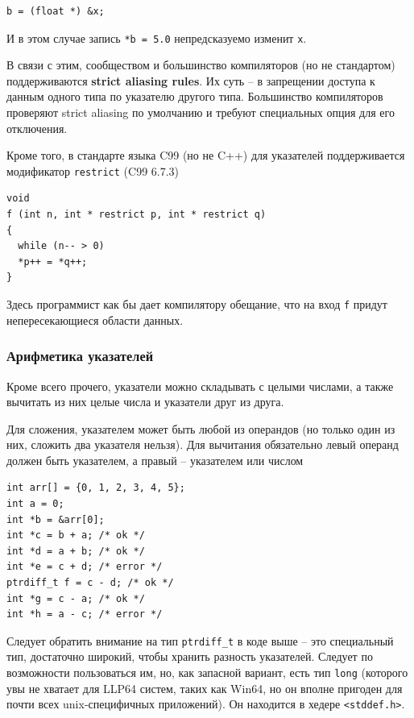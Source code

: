 \documentclass[a4paper,12pt,oneside]{article}
\begin{document}
\begin{lstlisting}
b = (float *) &x;
\end{lstlisting}

И в этом случае запись \lstinline!*b = 5.0! непредсказуемо изменит \lstinline!x!.

В связи с этим, сообществом и большинство компиляторов (но не стандартом) поддерживаются \textbf{strict aliasing rules}\label{StrictAliasing}. Их суть -- в запрещении доступа к данным одного типа по указателю другого типа. Большинство компиляторов проверяют strict aliasing по умолчанию и требуют специальных опция для его отключения.

Кроме того, в стандарте языка C99 (но не C++) для указателей поддерживается модификатор \lstinline!restrict! (C99 6.7.3)

\begin{lstlisting}
void 
f (int n, int * restrict p, int * restrict q)
{
  while (n-- > 0)
  *p++ = *q++;
}
\end{lstlisting}

Здесь программист как бы дает компилятору обещание, что на вход \lstinline!f! придут непересекающиеся области данных.

\subsubsection{Арифметика указателей}

Кроме всего прочего, указатели можно складывать с целыми числами, а также вычитать из них целые числа и указатели друг из друга.

Для сложения, указателем может быть любой из операндов (но только один из них, сложить два указателя нельзя). Для вычитания обязательно левый операнд должен быть указателем, а правый -- указателем или числом

\begin{lstlisting}
int arr[] = {0, 1, 2, 3, 4, 5};
int a = 0; 
int *b = &arr[0];
int *c = b + a; /* ok */
int *d = a + b; /* ok */
int *e = c + d; /* error */
ptrdiff_t f = c - d; /* ok */
int *g = c - a; /* ok */
int *h = a - c; /* error */
\end{lstlisting}

Следует обратить внимание на тип \lstinline!ptrdiff_t! в коде выше -- это специальный тип, достаточно широкий, чтобы хранить разность указателей. Следует по возможности пользоваться им, но, как запасной вариант, есть тип \lstinline!long! (которого увы не хватает для LLP64 систем, таких как Win64, но он вполне пригоден для почти всех unix-специфичных приложений). Он находится в хедере \lstinline!<stddef.h>!.
\end{document}
